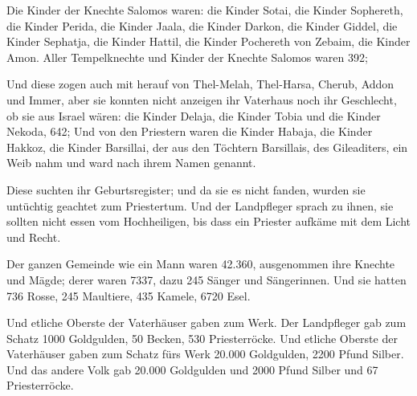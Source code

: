  Die Kinder der Knechte Salomos waren: die Kinder Sotai,
die Kinder Sophereth, die Kinder Perida,  die Kinder Jaala,
die Kinder Darkon, die Kinder Giddel,  die Kinder Sephatja,
die Kinder Hattil, die Kinder Pochereth von Zebaim, die Kinder Amon.
 Aller Tempelknechte und Kinder der Knechte Salomos waren
392;

 Und diese zogen auch mit herauf von Thel-Melah,
Thel-Harsa, Cherub, Addon und Immer, aber sie konnten nicht anzeigen ihr
Vaterhaus noch ihr Geschlecht, ob sie aus Israel wären: 
die Kinder Delaja, die Kinder Tobia und die Kinder Nekoda, 642;
 Und von den Priestern waren die Kinder Habaja, die Kinder
Hakkoz, die Kinder Barsillai, der aus den Töchtern Barsillais, des
Gileaditers, ein Weib nahm und ward nach ihrem Namen genannt.

 Diese suchten ihr Geburtsregister; und da sie es nicht
fanden, wurden sie untüchtig geachtet zum Priestertum.  Und
der Landpfleger sprach zu ihnen, sie sollten nicht essen vom
Hochheiligen, bis dass ein Priester aufkäme mit dem Licht und Recht.

 Der ganzen Gemeinde wie ein Mann waren 42.360,
 ausgenommen ihre Knechte und Mägde; derer waren 7337, dazu
245 Sänger und Sängerinnen.  Und sie hatten 736 Rosse, 245
Maultiere,  435 Kamele, 6720 Esel.

 Und etliche Oberste der Vaterhäuser gaben zum Werk. Der
Landpfleger gab zum Schatz 1000 Goldgulden, 50 Becken, 530
Priesterröcke.  Und etliche Oberste der Vaterhäuser gaben
zum Schatz fürs Werk 20.000 Goldgulden, 2200 Pfund Silber. 
Und das andere Volk gab 20.000 Goldgulden und 2000 Pfund Silber und 67
Priesterröcke.

